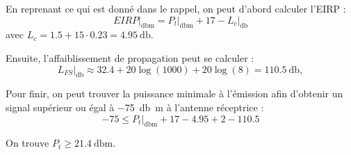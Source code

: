 \documentclass [a4paper, 11pt] {article}
\begin{document}
    \begin{reponse}
        En reprenant ce qui est donné dans le rappel, on peut d'abord calculer l'EIRP :
        \begin{equation}
            EIRP\Big|_{\si{\decibel\meter}} = P_t\Big|_{\si{\decibel\meter}} + 17 - L_c\Big|_{\si{\decibel}}
        \end{equation}
        avec $L_c = 1.5 + 15\cdot 0.23 = \SI{4.95}{\decibel}$.
        
        Ensuite, l'affaiblissement de propagation peut se calculer :
        \begin{equation}
            L_{FS}\Big|_{\si{\decibel}} \approx 32.4 + 20 \log(1000) + 20 \log(8) = \SI{110.5}{\decibel},
        \end{equation}
        
        Pour finir, on peut trouver la puissance minimale à l'émission afin d'obtenir un signal supérieur ou égal à \SI{-75}{\decibel\meter} à l'antenne réceptrice :
        \begin{equation}
            -75 \leq P_t\Big|_{\si{\decibel\meter}} + 17 - 4.95 + 2 - 110.5
        \end{equation}
        
        On trouve $P_t \geq \SI{21.4}{\decibel\meter}$.
        
        
    \end{reponse}
        
   
\end{document}
